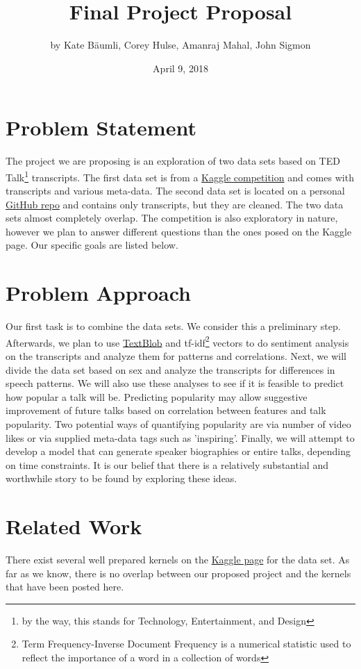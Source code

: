 \documentclass{article}
\title{Final Project Proposal}
\author{by Kate B{\"a}umli, Corey Hulse, Amanraj Mahal, John Sigmon}
\date{April 9, 2018}
\begin{document}
\maketitle

\section{Problem Statement}
The project we are proposing is an exploration of two data sets based on TED Talk\footnote{by the way, this stands for Technology, Entertainment, and Design} transcripts. The first data set is from a \href{https://www.kaggle.com/rounakbanik/ted-talks}{Kaggle competition} and comes with transcripts and various meta-data. The second data set is located on a personal \href{https://github.com/saranyan/TED-Talks}{GitHub repo} and contains only transcripts, but they are cleaned. The two data sets almost completely overlap. The competition is also exploratory in nature, however we plan to answer different questions than the ones posed on the Kaggle page. Our specific goals are listed below.

\section{Problem Approach}
Our first task is to combine the data sets. We consider this a preliminary step. Afterwards, we plan to use \href{http://textblob.readthedocs.io/en/dev/}{TextBlob} and tf-idf\footnote{Term Frequency-Inverse Document Frequency is a numerical statistic used to reflect the importance of a word in a collection of words} vectors to do sentiment analysis on the transcripts and analyze them for patterns and correlations. Next, we will divide the data set based on sex and analyze the transcripts for differences in speech patterns. We will also use these analyses to see if it is feasible to predict how popular a talk will be. Predicting popularity may allow suggestive improvement of future talks based on correlation between features and talk popularity. Two potential ways of quantifying popularity are via number of video likes or via supplied meta-data tags such as 'inspiring'. Finally, we will attempt to develop a model that can generate speaker biographies or entire talks, depending on time constraints. It is our belief that there is a relatively substantial and worthwhile story to be found by exploring these ideas.

\section{Related Work}
There exist several well prepared kernels on the \href{https://www.kaggle.com/rounakbanik/ted-talks/kernels}{Kaggle page} for the data set. As far as we know, there is no overlap between our proposed project and the kernels that have been posted here. 
\end{document}
